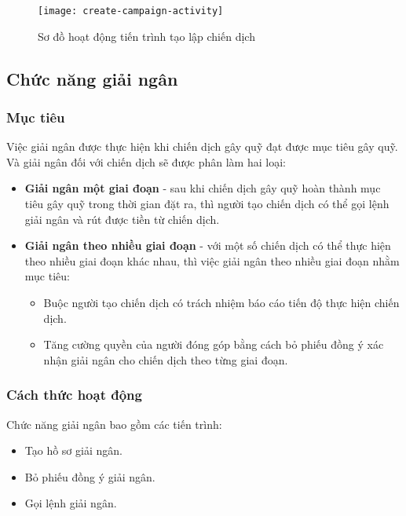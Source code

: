 \documentclass[../main-report.tex]{subfiles}
\begin{document}
\begin{figure}[ht!]
\begin{center}
\label{fig:create-campaign-activity}
\texttt{[image: create-campaign-activity]}
\caption{Sơ đồ hoạt động tiến trình tạo lập chiến dịch}
\end{center}
\end{figure}

\subsection{Chức năng giải ngân}
\subsubsection{Mục tiêu}
Việc giải ngân được thực hiện khi chiến dịch gây quỹ đạt được mục tiêu gây quỹ. Và giải ngân đối với chiến dịch sẽ được phân làm hai loại:

\begin{itemize}
\item \textbf{Giải ngân một giai đoạn} - sau khi chiến dịch gây quỹ hoàn thành mục tiêu gây quỹ trong thời gian đặt ra, thì người tạo chiến dịch có thể gọi lệnh giải ngân và rút được tiền từ chiến dịch.
\item \textbf{Giải ngân theo nhiều giai đoạn} - với một số chiến dịch có thể thực hiện theo nhiều giai đoạn khác nhau, thì việc giải ngân theo nhiều giai đoạn nhằm mục tiêu:
\begin{itemize}
\item Buộc người tạo chiến dịch có trách nhiệm báo cáo tiến độ thực hiện chiến dịch.
\item Tăng cường quyền của người đóng góp bằng cách bỏ phiếu đồng ý xác nhận giải ngân cho chiến dịch theo từng giai đoạn.
\end{itemize}
\end{itemize}

\subsubsection{Cách thức hoạt động}
Chức năng giải ngân bao gồm các tiến trình:

\begin{itemize}
\item Tạo hồ sơ giải ngân.
\item Bỏ phiếu đồng ý giải ngân.
\item Gọi lệnh giải ngân.
\end{itemize}
\end{document}
